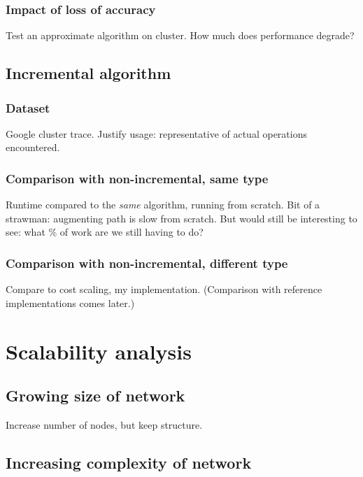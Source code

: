 \subsubsection{Impact of loss of accuracy}

Test an approximate algorithm on cluster. How much does performance degrade?

\subsection{Incremental algorithm} \label{sec:eval-incremental}

\subsubsection{Dataset}

Google cluster trace. Justify usage: representative of actual operations encountered.

\subsubsection{Comparison with non-incremental, same type}

Runtime compared to the {\it same} algorithm, running from scratch. Bit of a strawman: augmenting path is slow from scratch. But would still be interesting to see: what \% of work are we still having to do?

\subsubsection{Comparison with non-incremental, different type}

Compare to cost scaling, my implementation. (Comparison with reference implementations comes later.)

\section{Scalability analysis}

\subsection{Growing size of network}

Increase number of nodes, but keep structure.

\subsection{Increasing complexity of network}

